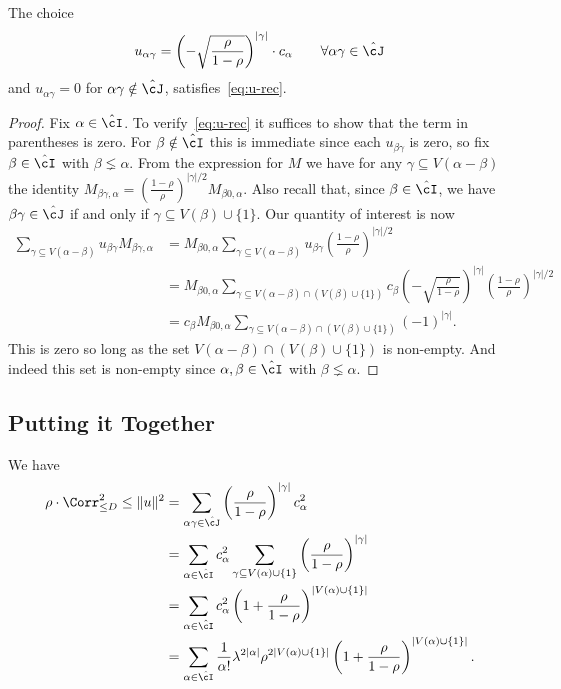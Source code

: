 \documentclass[11pt]{article}
\begin{document}
\begin{lemma}\label{lem:def-u-subm}
The choice
\[ u_{\alpha\gamma} = \left(-\sqrt{\frac{\rho}{1-\rho}}\right)^{|\gamma|} \cdot c_\alpha \qquad \forall \alpha\gamma \in \hat\cJ \]
and $u_{\alpha\gamma} = 0$ for $\alpha\gamma \notin\hat\cJ$, satisfies~\eqref{eq:u-rec}. 
\end{lemma}

\begin{proof}
Fix $\alpha \in \hat\cI$. To verify~\eqref{eq:u-rec} it suffices to show that the term in parentheses is zero. For $\beta \notin \hat\cI$ this is immediate since each $u_{\beta\gamma}$ is zero, so fix $\beta \in \hat\cI$ with $\beta \lneq \alpha$. From the expression for $M$ we have for any $\gamma \subseteq V(\alpha-\beta)$ the identity $M_{\beta\gamma,\alpha} = \left(\frac{1-\rho}{\rho}\right)^{|\gamma|/2} M_{\beta 0,\alpha}$. Also recall that, since $\beta \in \hat\cI$, we have $\beta\gamma \in \hat\cJ$ if and only if $\gamma \subseteq V(\beta) \cup \{1\}$. Our quantity of interest is now
\begin{align*}
\sum_{\gamma \subseteq V(\alpha-\beta)} u_{\beta\gamma} M_{\beta\gamma,\alpha} &= M_{\beta 0,\alpha} \sum_{\gamma \subseteq V(\alpha-\beta)} u_{\beta\gamma} \left(\frac{1-\rho}{\rho}\right)^{|\gamma|/2} \\
&= M_{\beta 0,\alpha} \sum_{\gamma \subseteq V(\alpha-\beta) \cap (V(\beta) \cup \{1\})} c_\beta \left(-\sqrt{\frac{\rho}{1-\rho}}\right)^{|\gamma|} \left(\frac{1-\rho}{\rho}\right)^{|\gamma|/2} \\
&= c_\beta M_{\beta 0,\alpha} \sum_{\gamma \subseteq V(\alpha-\beta) \cap (V(\beta) \cup \{1\})} (-1)^{|\gamma|}.
\end{align*}
This is zero so long as the set $V(\alpha-\beta) \cap (V(\beta) \cup \{1\})$ is non-empty. And indeed this set is non-empty since $\alpha,\beta \in \hat\cI$ with $\beta \lneq \alpha$.
\end{proof}


\subsection{Putting it Together}

We have
\begin{align*}
\rho \cdot \Corr_{\le D}^2 \le \|u\|^2 &= \sum_{\alpha\gamma \in \hat\cJ} \left(\frac{\rho}{1-\rho}\right)^{|\gamma|} c_\alpha^2 \\
&= \sum_{\alpha \in \hat\cI} c_\alpha^2 \sum_{\gamma \subseteq V(\alpha) \cup \{1\}} \left(\frac{\rho}{1-\rho}\right)^{|\gamma|} \\
&= \sum_{\alpha \in \hat\cI} c_\alpha^2 \left(1 + \frac{\rho}{1-\rho}\right)^{|V(\alpha) \cup \{1\}|} \\
&= \sum_{\alpha \in \hat\cI} \frac{1}{\alpha!} \lambda^{2|\alpha|} \rho^{2|V(\alpha) \cup \{1\}|} \left(1 + \frac{\rho}{1-\rho}\right)^{|V(\alpha) \cup \{1\}|}.
\end{align*}
\end{document}
